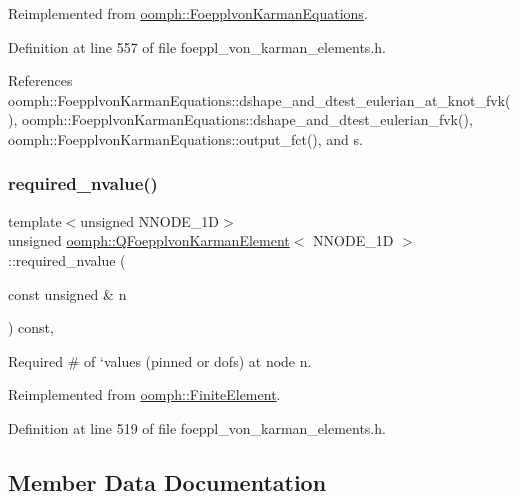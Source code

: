 Reimplemented from \hyperlink{classoomph_1_1FoepplvonKarmanEquations_a3eecb6536ce104ef6fbf3602b306bd37}{oomph\+::\+Foepplvon\+Karman\+Equations}.



Definition at line 557 of file foeppl\+\_\+von\+\_\+karman\+\_\+elements.\+h.



References oomph\+::\+Foepplvon\+Karman\+Equations\+::dshape\+\_\+and\+\_\+dtest\+\_\+eulerian\+\_\+at\+\_\+knot\+\_\+fvk(), oomph\+::\+Foepplvon\+Karman\+Equations\+::dshape\+\_\+and\+\_\+dtest\+\_\+eulerian\+\_\+fvk(), oomph\+::\+Foepplvon\+Karman\+Equations\+::output\+\_\+fct(), and s.

\mbox{\label{classoomph_1_1QFoepplvonKarmanElement_a9fb4b0ecf405369f564e0c8c6a169d00}} 
\subsubsection{\texorpdfstring{required\+\_\+nvalue()}{required\_nvalue()}}
{\footnotesize\ttfamily template$<$unsigned N\+N\+O\+D\+E\+\_\+1D$>$ \\
unsigned \hyperlink{classoomph_1_1QFoepplvonKarmanElement}{oomph\+::\+Q\+Foepplvon\+Karman\+Element}$<$ N\+N\+O\+D\+E\+\_\+1D $>$\+::required\+\_\+nvalue (\begin{DoxyParamCaption}\item[{const unsigned \&}]{n }\end{DoxyParamCaption}) const\hspace{0.3cm}{\ttfamily [inline]}, {\ttfamily [virtual]}}



Required \# of `values\textquotesingle{} (pinned or dofs) at node n. 



Reimplemented from \hyperlink{classoomph_1_1FiniteElement_a56610c60d5bc2d7c27407a1455471b1a}{oomph\+::\+Finite\+Element}.



Definition at line 519 of file foeppl\+\_\+von\+\_\+karman\+\_\+elements.\+h.



\subsection{Member Data Documentation}
\mbox{\label{classoomph_1_1QFoepplvonKarmanElement_a5af9d6e7f38cd9a97d81cbf52f4de51a}} 
